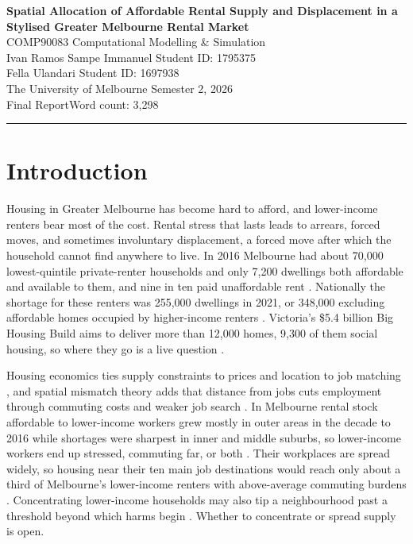 \documentclass[10pt,a4paper]{article}
\begin{document}
\begin{center}
    {\Large\bfseries Spatial Allocation of Affordable Rental Supply and Displacement in a Stylised Greater Melbourne Rental Market}\\[0.8em]
    {\large COMP90083 Computational Modelling \& Simulation}\\[0.4em]
    {\normalsize
        Ivan Ramos Sampe Immanuel \quad Student ID: 1795375\\[0.2em]
        Fella Ulandari \quad Student ID: 1697938}\\[0.4em]
    {\normalsize The University of Melbourne \quad Semester 2, 2026}\\[0.4em]
    {\normalsize Final Report\quad Word count: 3,298}
\end{center}

\noindent\rule{\textwidth}{0.4pt}

\section*{Introduction}

Housing in Greater Melbourne has become hard to afford, and lower-income renters bear most of the cost. Rental stress that lasts leads to arrears, forced moves, and sometimes involuntary displacement, a forced move after which the household cannot find anywhere to live. In 2016 Melbourne had about 70,000 lowest-quintile private-renter households and only 7,200 dwellings both affordable and available to them, and nine in ten paid unaffordable rent \citep{1}. Nationally the shortage for these renters was 255,000 dwellings in 2021, or 348,000 excluding affordable homes occupied by higher-income renters \citep{2}. Victoria's \$5.4 billion Big Housing Build aims to deliver more than 12,000 homes, 9,300 of them social housing, so where they go is a live question \citep{3}.

Housing economics ties supply constraints to prices \citep{4} and location to job matching \citep{5}, and spatial mismatch theory adds that distance from jobs cuts employment through commuting costs and weaker job search \citep{6,7}. In Melbourne rental stock affordable to lower-income workers grew mostly in outer areas in the decade to 2016 while shortages were sharpest in inner and middle suburbs, so lower-income workers end up stressed, commuting far, or both \citep{8}. Their workplaces are spread widely, so housing near their ten main job destinations would reach only about a third of Melbourne's lower-income renters with above-average commuting burdens \citep{9}. Concentrating lower-income households may also tip a neighbourhood past a threshold beyond which harms begin \citep{10}. Whether to concentrate or spread supply is open.
\end{document}
